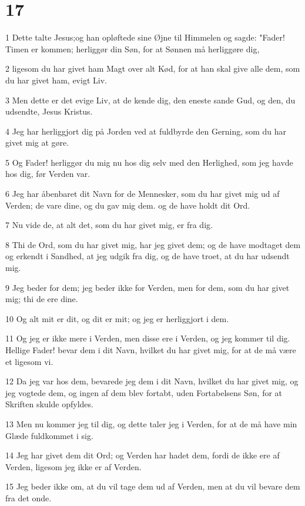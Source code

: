 \chapter{17}

\par 1 Dette talte Jesus;og han opløftede sine Øjne til Himmelen og sagde: "Fader! Timen er kommen; herliggør din Søn, for at Sønnen må herliggøre dig,
\par 2 ligesom du har givet ham Magt over alt Kød, for at han skal give alle dem, som du har givet ham, evigt Liv.
\par 3 Men dette er det evige Liv, at de kende dig, den eneste sande Gud, og den, du udsendte, Jesus Kristus.
\par 4 Jeg har herliggjort dig på Jorden ved at fuldbyrde den Gerning, som du har givet mig at gøre.
\par 5 Og Fader! herliggør du mig nu hos dig selv med den Herlighed, som jeg havde hos dig, før Verden var.
\par 6 Jeg har åbenbaret dit Navn for de Mennesker, som du har givet mig ud af Verden; de vare dine, og du gav mig dem. og de have holdt dit Ord.
\par 7 Nu vide de, at alt det, som du har givet mig, er fra dig.
\par 8 Thi de Ord, som du har givet mig, har jeg givet dem; og de have modtaget dem og erkendt i Sandhed, at jeg udgik fra dig, og de have troet, at du har udsendt mig.
\par 9 Jeg beder for dem; jeg beder ikke for Verden, men for dem, som du har givet mig; thi de ere dine.
\par 10 Og alt mit er dit, og dit er mit; og jeg er herliggjort i dem.
\par 11 Og jeg er ikke mere i Verden, men disse ere i Verden, og jeg kommer til dig. Hellige Fader! bevar dem i dit Navn, hvilket du har givet mig, for at de må være et ligesom vi.
\par 12 Da jeg var hos dem, bevarede jeg dem i dit Navn, hvilket du har givet mig, og jeg vogtede dem, og ingen af dem blev fortabt, uden Fortabelsens Søn, for at Skriften skulde opfyldes.
\par 13 Men nu kommer jeg til dig, og dette taler jeg i Verden, for at de må have min Glæde fuldkommet i sig.
\par 14 Jeg har givet dem dit Ord; og Verden har hadet dem, fordi de ikke ere af Verden, ligesom jeg ikke er af Verden.
\par 15 Jeg beder ikke om, at du vil tage dem ud af Verden, men at du vil bevare dem fra det onde.
